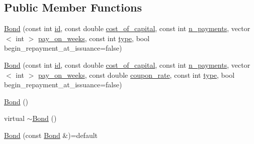 \subsection*{Public Member Functions}
\begin{DoxyCompactItemize}
\item 
\mbox{\hyperlink{classBond_ac2ed54d795433c9c6a4236629553fb83_ac2ed54d795433c9c6a4236629553fb83}{Bond}} (const int \mbox{\hyperlink{classBond_a7f75bcafbc16676ad6dbafbf40afae4a_a7f75bcafbc16676ad6dbafbf40afae4a}{id}}, const double \mbox{\hyperlink{classBond_ad98df7d28b398e620286f95ee085439b_ad98df7d28b398e620286f95ee085439b}{cost\+\_\+of\+\_\+capital}}, const int \mbox{\hyperlink{classBond_a4a227b6de2eeada118d82ab1633b1db8_a4a227b6de2eeada118d82ab1633b1db8}{n\+\_\+payments}}, vector$<$ int $>$ \mbox{\hyperlink{classBond_ae8dd46fcbf95c993460ffe4ea1f52739_ae8dd46fcbf95c993460ffe4ea1f52739}{pay\+\_\+on\+\_\+weeks}}, const int \mbox{\hyperlink{classBond_a48da24878beedd71cbaa990cea860667_a48da24878beedd71cbaa990cea860667}{type}}, bool begin\+\_\+repayment\+\_\+at\+\_\+issuance=false)
\item 
\mbox{\hyperlink{classBond_a8758b7ef325a779eeee87eb91947ce58_a8758b7ef325a779eeee87eb91947ce58}{Bond}} (const int \mbox{\hyperlink{classBond_a7f75bcafbc16676ad6dbafbf40afae4a_a7f75bcafbc16676ad6dbafbf40afae4a}{id}}, const double \mbox{\hyperlink{classBond_ad98df7d28b398e620286f95ee085439b_ad98df7d28b398e620286f95ee085439b}{cost\+\_\+of\+\_\+capital}}, const int \mbox{\hyperlink{classBond_a4a227b6de2eeada118d82ab1633b1db8_a4a227b6de2eeada118d82ab1633b1db8}{n\+\_\+payments}}, vector$<$ int $>$ \mbox{\hyperlink{classBond_ae8dd46fcbf95c993460ffe4ea1f52739_ae8dd46fcbf95c993460ffe4ea1f52739}{pay\+\_\+on\+\_\+weeks}}, const double \mbox{\hyperlink{classBond_a5f66785534e24caa43d9f730130a6463_a5f66785534e24caa43d9f730130a6463}{coupon\+\_\+rate}}, const int \mbox{\hyperlink{classBond_a48da24878beedd71cbaa990cea860667_a48da24878beedd71cbaa990cea860667}{type}}, bool begin\+\_\+repayment\+\_\+at\+\_\+issuance=false)
\item 
\mbox{\hyperlink{classBond_a5b809c10637a30a2b24ed01609d68711_a5b809c10637a30a2b24ed01609d68711}{Bond}} ()
\item 
virtual \mbox{\hyperlink{classBond_a6072f41bd412cb66b4fb13833a14d0ec_a6072f41bd412cb66b4fb13833a14d0ec}{$\sim$\+Bond}} ()
\item 
\mbox{\hyperlink{classBond_acaa8874ed5e81057eeb7dc55fb6b5373_acaa8874ed5e81057eeb7dc55fb6b5373}{Bond}} (const \mbox{\hyperlink{classBond}{Bond}} \&)=default
\item 

\end{DoxyCompactItemize}
